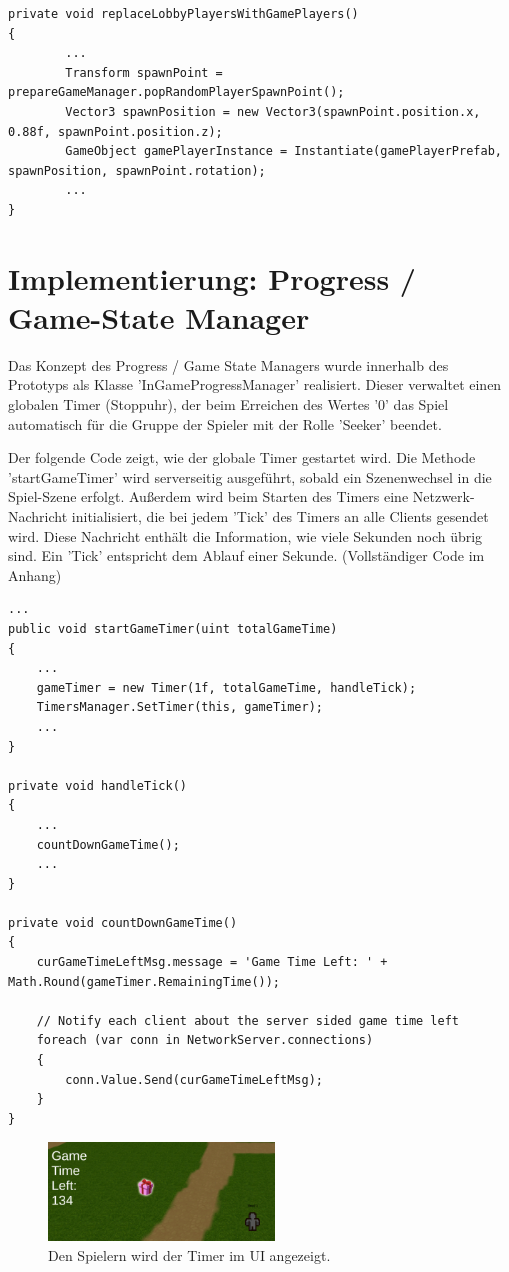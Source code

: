 \begin{lstlisting}[caption= GameNetworkManager.cs replaceLobbyPlayersWithGamePlayers()]
private void replaceLobbyPlayersWithGamePlayers()
{
		...
		Transform spawnPoint = prepareGameManager.popRandomPlayerSpawnPoint();
		Vector3 spawnPosition = new Vector3(spawnPoint.position.x, 0.88f, spawnPoint.position.z);
		GameObject gamePlayerInstance = Instantiate(gamePlayerPrefab, spawnPosition, spawnPoint.rotation);
		...
}
\end{lstlisting}


\section{Implementierung: Progress / Game-State Manager}
\label{Progress Manager}

Das Konzept des Progress / Game State Managers wurde innerhalb des Prototyps als Klasse 'InGameProgressManager' realisiert. Dieser verwaltet einen globalen Timer (Stoppuhr), der beim Erreichen des Wertes '0' das Spiel automatisch für die Gruppe der Spieler mit der Rolle 'Seeker' beendet.

Der folgende Code zeigt, wie der globale Timer gestartet wird. Die Methode 'startGameTimer' wird serverseitig ausgeführt, sobald ein Szenenwechsel in die Spiel-Szene erfolgt. Außerdem wird beim Starten des Timers eine Netzwerk-Nachricht initialisiert, die bei jedem 'Tick' des Timers an alle Clients gesendet wird. Diese Nachricht enthält die Information, wie viele Sekunden noch übrig sind. Ein 'Tick' entspricht dem Ablauf einer Sekunde. (Vollständiger Code im Anhang)

\begin{lstlisting}[caption= InGameProgressManager.cs global Game Time Handling]
...
public void startGameTimer(uint totalGameTime)
{
	...
	gameTimer = new Timer(1f, totalGameTime, handleTick);
	TimersManager.SetTimer(this, gameTimer);
	...
}

private void handleTick()
{
	...
	countDownGameTime();
	...
}

private void countDownGameTime()
{
	curGameTimeLeftMsg.message = 'Game Time Left: ' + Math.Round(gameTimer.RemainingTime());
	
	// Notify each client about the server sided game time left
	foreach (var conn in NetworkServer.connections)
	{
		conn.Value.Send(curGameTimeLeftMsg);
	}
}
\end{lstlisting}

\begin{figure}[H]
	\centering
	\includegraphics[width=60mm]{images/prototyp_game_timer.png}
	\caption[Time Left Counter]{Den Spielern wird der Timer im UI angezeigt.}
	\label{pic:prototyp_game_timer}
\end{figure}

